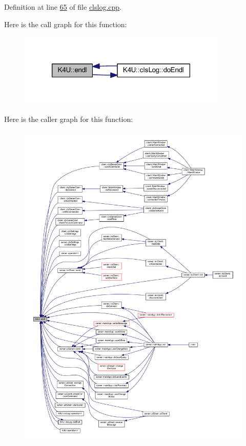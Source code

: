 Definition at line \hyperlink{clslog_8cpp_source_l00065}{65} of file \hyperlink{clslog_8cpp_source}{clslog.\-cpp}.



Here is the call graph for this function\-:\nopagebreak
\begin{figure}[H]
\begin{center}
\leavevmode
\includegraphics[width=282pt]{d6/d75/namespace_k4_u_aaddaee50fab2801df390147891b0c09d_cgraph}
\end{center}
\end{figure}




Here is the caller graph for this function\-:
\nopagebreak
\begin{figure}[H]
\begin{center}
\leavevmode
\includegraphics[width=350pt]{d6/d75/namespace_k4_u_aaddaee50fab2801df390147891b0c09d_icgraph}
\end{center}
\end{figure}


